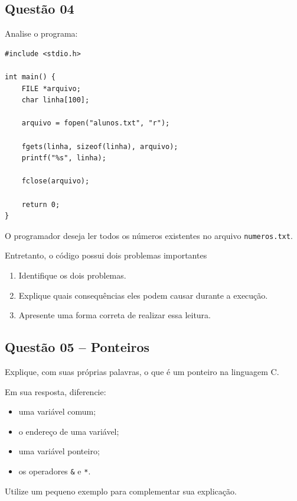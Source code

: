 \documentclass[12pt,a4paper]{article}
\begin{document}

\subsection*{Questão 04}

Analise o programa:

\begin{lstlisting}
#include <stdio.h>

int main() {
    FILE *arquivo;
    char linha[100];

    arquivo = fopen("alunos.txt", "r");

    fgets(linha, sizeof(linha), arquivo);
    printf("%s", linha);

    fclose(arquivo);

    return 0;
}
\end{lstlisting}

O programador deseja ler todos os números existentes no arquivo
\texttt{numeros.txt}.

Entretanto, o código possui dois problemas importantes

\begin{enumerate}[label=\alph*)]
    \item Identifique os dois problemas.
    \item Explique quais consequências eles podem causar durante a execução.
    \item Apresente uma forma correta de realizar essa leitura.
\end{enumerate}

\subsection*{Questão 05 -- Ponteiros}

Explique, com suas próprias palavras, o que é um ponteiro na
linguagem C.

Em sua resposta, diferencie:

\begin{itemize}
    \item uma variável comum;
    \item o endereço de uma variável;
    \item uma variável ponteiro;
    \item os operadores \texttt{\&} e \texttt{*}.
\end{itemize}

Utilize um pequeno exemplo para complementar sua explicação.
\end{document}
